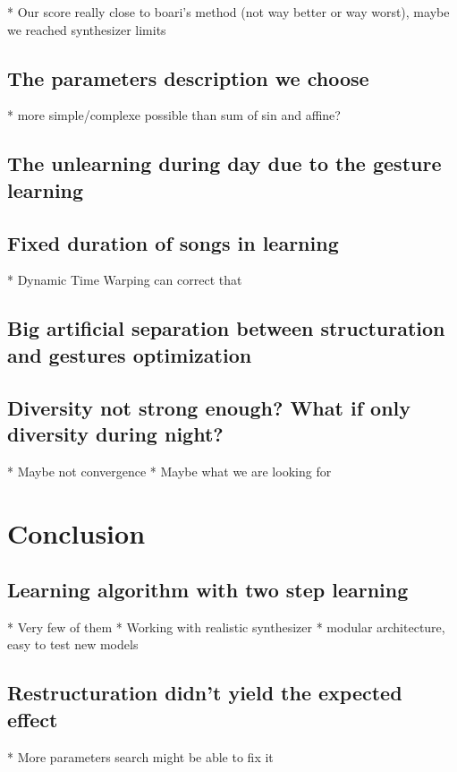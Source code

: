 \documentclass{report}
\begin{document}
  * Our score really close to boari's method (not way better or way
  worst), maybe we reached synthesizer limits

\section{The parameters description we choose}
\label{the-parameters-description-we-choose}

  * more simple/complexe possible than sum of sin and affine?
\section{The unlearning during day due to the gesture
learning}\label{the-unlearning-during-day-due-to-the-gesture-learning}

\section{Fixed duration of songs in
learning}\label{fixed-duration-of-songs-in-learning}

  * Dynamic Time Warping can correct that
\section{Big artificial separation between structuration and gestures
optimization}\label{big-artificial-separation-between-structuration-and-gestures-optimization}

\section{Diversity not strong enough? What if only diversity during
night?}\label{diversity-not-strong-enough-what-if-only-diversity-during-night}

  * Maybe not convergence
  * Maybe what we are looking for
\chapter{Conclusion}\label{conclusion}

\section{Learning algorithm with two step
learning}\label{learning-algorithm-with-two-step-learning}

  * Very few of them
  * Working with realistic synthesizer
  * modular architecture, easy to test new models
\section{Restructuration didn't yield the expected
effect}\label{restructuration-didnt-yield-the-expected-effect}

 * More parameters search might be able to fix it

\printbibliography{}
\end{document}
